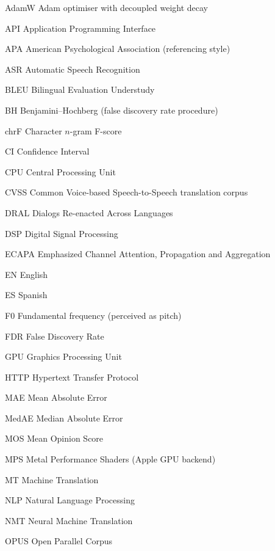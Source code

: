 
{\singlespacing
\begin{abbreviations}
\item[AdamW] Adam optimiser with decoupled weight decay
\item[API] Application Programming Interface
\item[APA] American Psychological Association (referencing style)
\item[ASR] Automatic Speech Recognition
\item[BLEU] Bilingual Evaluation Understudy
\item[BH] Benjamini--Hochberg (false discovery rate procedure)
\item[chrF] Character $n$-gram F-score
\item[CI] Confidence Interval
\item[CPU] Central Processing Unit
\item[CVSS] Common Voice-based Speech-to-Speech translation corpus
\item[DRAL] Dialogs Re-enacted Across Languages
\item[DSP] Digital Signal Processing
\item[ECAPA] Emphasized Channel Attention, Propagation and Aggregation
\item[EN] English
\item[ES] Spanish
\item[F0] Fundamental frequency (perceived as pitch)
\item[FDR] False Discovery Rate
\item[GPU] Graphics Processing Unit
\item[HTTP] Hypertext Transfer Protocol
\item[MAE] Mean Absolute Error
\item[MedAE] Median Absolute Error
\item[MOS] Mean Opinion Score
\item[MPS] Metal Performance Shaders (Apple GPU backend)
\item[MT] Machine Translation
\item[NLP] Natural Language Processing
\item[NMT] Neural Machine Translation
\item[OPUS] Open Parallel Corpus

\end{abbreviations}}
